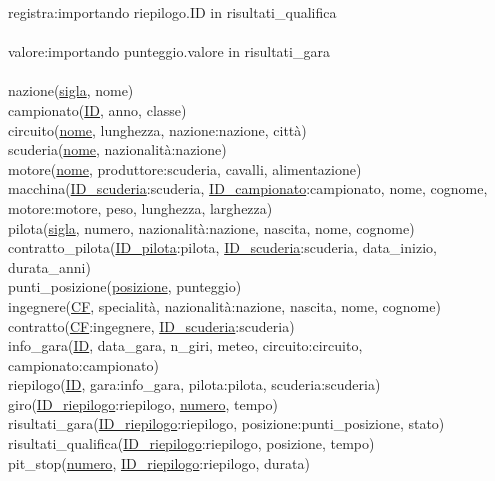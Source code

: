 \documentclass[a4paper,12pt]{report}
\begin{document}
	registra:\tab				importando riepilogo.ID in risultati\_qualifica\\\\
	valore:\tab					importando punteggio.valore in risultati\_gara\\\\
	nazione(\underline{sigla}, nome)\\
	campionato(\underline{ID}, anno, classe)\\
	circuito(\underline{nome}, lunghezza, nazione:nazione, città)\\
	scuderia(\underline{nome}, nazionalità:nazione)\\
	motore(\underline{nome}, produttore:scuderia, cavalli, alimentazione)\\
	macchina(\underline{ID\_scuderia}:scuderia, \underline{ID\_campionato}:campionato, nome, cognome,
	\tab\tab motore:motore, peso, lunghezza, larghezza)\\
	pilota(\underline{sigla}, numero, nazionalità:nazione, nascita, nome, cognome)\\
	contratto\_pilota(\underline{ID\_pilota}:pilota, \underline{ID\_scuderia}:scuderia, data\_inizio, durata\_anni)\\
	punti\_posizione(\underline{posizione}, punteggio)\\
	ingegnere(\underline{CF}, specialità, nazionalità:nazione, nascita, nome, cognome)\\
	contratto(\underline{CF}:ingegnere, \underline{ID\_scuderia}:scuderia)\\
	info\_gara(\underline{ID}, data\_gara, n\_giri, meteo, circuito:circuito, campionato:campionato)\\
	riepilogo(\underline{ID}, gara:info\_gara, pilota:pilota, scuderia:scuderia)\\
	giro(\underline{ID\_riepilogo}:riepilogo, \underline{numero}, tempo)\\
	risultati\_gara(\underline{ID\_riepilogo}:riepilogo, posizione:punti\_posizione, stato)\\
	risultati\_qualifica(\underline{ID\_riepilogo}:riepilogo, posizione, tempo)\\
	pit\_stop(\underline{numero}, \underline{ID\_riepilogo}:riepilogo, durata)\\
\end{document}
